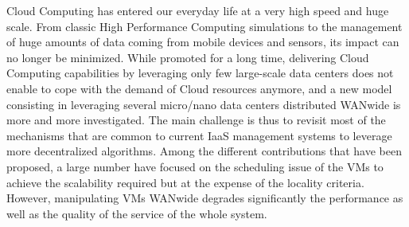 
Cloud Computing has entered our everyday life at a very high speed and huge scale. From
classic High Performance Computing simulations to the management of huge amounts of data
coming from mobile devices and sensors, its impact can no longer be minimized.
While promoted for a long time, delivering Cloud Computing capabilities by leveraging
only few large-scale data centers does not enable to cope with the demand of Cloud resources
anymore, and a new model consisting in leveraging several micro/nano data centers
distributed WANwide is more and more investigated. The main challenge is thus to revisit
most of the mechanisms that are common to current IaaS management systems to
leverage more decentralized algorithms. Among the different contributions that have been
proposed, a large number have focused on the scheduling issue of the VMs to
achieve the scalability required but at the expense of the locality criteria. However,
manipulating VMs WANwide degrades significantly the performance as well as the quality of
the service of the whole system.

% 

